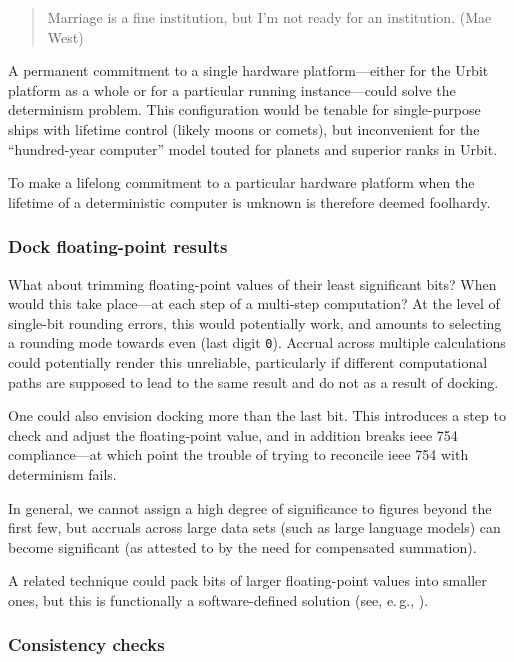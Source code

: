 \documentclass[twoside]{article}
\begin{document}
\begin{quote}
Marriage is a fine institution, but I'm not ready for an institution.  (Mae West)
\end{quote}
  
A permanent commitment to a single hardware platform—either for the Urbit platform as a whole or for a particular running instance—could solve the determinism problem.  This configuration would be tenable for single-purpose ships with lifetime control (likely moons or comets), but inconvenient for the “hundred-year computer” model touted for planets and superior ranks in Urbit.

To make a lifelong commitment to a particular hardware platform when the lifetime of a deterministic computer is unknown is therefore deemed foolhardy.

\subsubsection{Dock floating-point results}

What about trimming floating-point values of their least significant bits?  When would this take place—at each step of a multi-step computation?  At the level of single-bit rounding errors, this would potentially work, and amounts to selecting a rounding mode towards even (last digit \texttt{0}).  Accrual across multiple calculations could potentially render this unreliable, particularly if different computational paths are supposed to lead to the same result and do not as a result of docking.

One could also envision docking more than the last bit.  This introduces a step to check and adjust the floating-point value, and in addition breaks {\sc ieee} 754 compliance—at which point the trouble of trying to reconcile {\sc ieee} 754 with determinism fails.

In general, we cannot assign a high degree of significance to figures beyond the first few, but accruals across large data sets (such as large language models) can become significant (as attested to by the need for compensated summation).

A related technique could pack bits of larger floating-point values into smaller ones, but this is functionally a software-defined solution (see, e.\,g., \citet{LeBrun2018}).

\subsubsection{Consistency checks}
\end{document}
